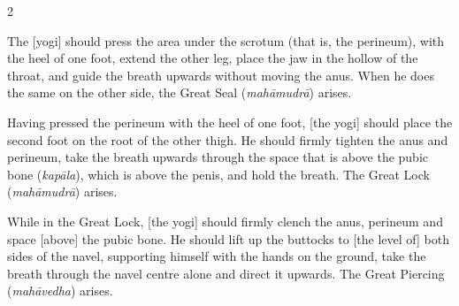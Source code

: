 \begin{nohyp}
\begin{multicols}{2}
\begin{eng}

The [yogi] should press the area under the scrotum (that is, the perineum), with the heel of one foot, extend the other leg, place the jaw in the hollow of the throat, and guide the breath upwards without moving the anus. When he does the same on the other side, the Great Seal (\textit{mahāmudrā}) arises.
\vskip 7pt


Having pressed the perineum with the heel of one foot, [the yogi] should place the second foot on the root of the other thigh. He should firmly tighten the anus and perineum, take the breath upwards through the space that is above the pubic bone (\textit{kapāla}), which is above the penis, and hold the breath. The Great Lock (\textit{mahāmudrā}) arises.
\vskip 7pt


While in the Great Lock, [the yogi] should firmly clench the anus, perineum and space [above] the pubic bone. He should lift up the buttocks to [the level of] both sides of the navel, supporting himself with the hands on the ground, take the breath through the navel centre alone and direct it upwards. The Great Piercing (\textit{mahāvedha}) arises.
\end{eng}
\end{multicols}
\end{nohyp}

\newpage

